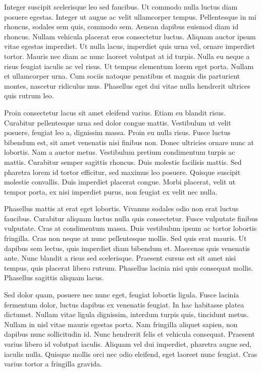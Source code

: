 \documentclass[a4paper]{article}
\begin{document}
Integer suscipit scelerisque leo sed faucibus. Ut commodo nulla luctus diam posuere egestas. Integer ut augue ac velit ullamcorper tempus. Pellentesque in mi rhoncus, sodales sem quis, commodo sem. Aenean dapibus euismod diam id rhoncus. Nullam vehicula placerat eros consectetur luctus. Aliquam auctor ipsum vitae egestas imperdiet. Ut nulla lacus, imperdiet quis urna vel, ornare imperdiet tortor. Mauris nec diam ac nunc laoreet volutpat at id turpis. Nulla eu neque a risus feugiat iaculis ac vel risus. Ut tempus elementum lorem eget porta. Nullam et ullamcorper urna. Cum sociis natoque penatibus et magnis dis parturient montes, nascetur ridiculus mus. Phasellus eget dui vitae nulla hendrerit ultrices quis rutrum leo.

Proin consectetur lacus sit amet eleifend varius. Etiam eu blandit risus. Curabitur pellentesque urna sed dolor congue mattis. Vestibulum ut velit posuere, feugiat leo a, dignissim massa. Proin eu nulla risus. Fusce luctus bibendum est, sit amet venenatis nisi finibus non. Donec ultricies ornare nunc at lobortis. Nam a auctor metus. Vestibulum pretium condimentum turpis ac mattis. Curabitur semper sagittis rhoncus. Duis molestie facilisis mattis. Sed pharetra lorem id tortor efficitur, sed maximus leo posuere. Quisque suscipit molestie convallis. Duis imperdiet placerat congue. Morbi placerat, velit ut tempor porta, ex nisi imperdiet purus, non feugiat ex velit nec nulla.

Phasellus mattis at erat eget lobortis. Vivamus sodales odio non erat luctus faucibus. Curabitur aliquam luctus nulla quis consectetur. Fusce vulputate finibus vulputate. Cras at condimentum massa. Duis vestibulum ipsum ac tortor lobortis fringilla. Cras non neque at nunc pellentesque mollis. Sed quis erat mauris. Ut dapibus sem lectus, quis imperdiet diam bibendum et. Maecenas quis venenatis ante. Nunc blandit a risus sed scelerisque. Praesent cursus est sit amet nisi tempus, quis placerat libero rutrum. Phasellus lacinia nisi quis consequat mollis. Phasellus sagittis aliquam lacus.

Sed dolor quam, posuere nec nunc eget, feugiat lobortis ligula. Fusce lacinia fermentum dolor, luctus dapibus ex venenatis feugiat. In hac habitasse platea dictumst. Nullam vitae ligula dignissim, interdum turpis quis, tincidunt metus. Nullam in nisl vitae mauris egestas porta. Nam fringilla aliquet sapien, non dapibus nunc sollicitudin id. Nunc hendrerit felis et vehicula consequat. Praesent varius libero id volutpat iaculis. Aliquam vel dui imperdiet, pharetra augue sed, iaculis nulla. Quisque mollis orci nec odio eleifend, eget laoreet nunc feugiat. Cras varius tortor a fringilla gravida.
\end{document}
